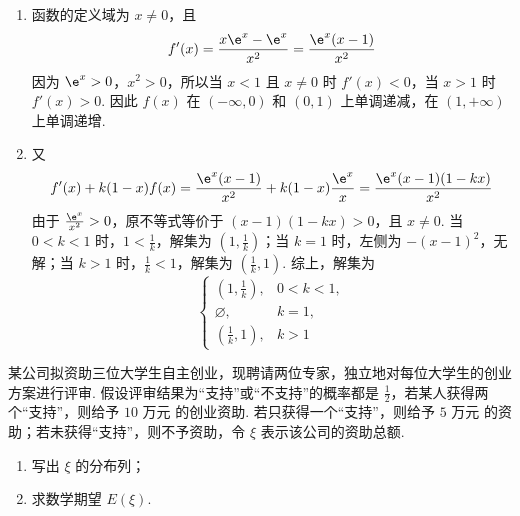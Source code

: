 \begin{solution}
\begin{enumerate}
\item
函数的定义域为 \(x\neq0\)，且
\[
f'(x)=\frac{x\e^{x}-\e^{x}}{x^{2}}=\frac{\e^{x}(x-1)}{x^{2}}
\]
因为 \(\e^{x}>0\)，\(x^{2}>0\)，所以当 \(x<1\) 且 \(x\neq0\) 时 \(f'(x)<0\)，当 \(x>1\) 时 \(f'(x)>0\). 因此 \(f(x)\) 在 \((-\infty,0)\) 和 \((0,1)\) 上单调递减，在 \((1,+\infty)\) 上单调递增.

\item
又
\[
f'(x)+k(1-x)f(x)=\frac{\e^{x}(x-1)}{x^{2}}+k(1-x)\frac{\e^{x}}{x}
=\frac{\e^{x}(x-1)(1-kx)}{x^{2}}
\]
由于 \(\frac{\e^{x}}{x^{2}}>0\)，原不等式等价于 \((x-1)(1-kx)>0\)，且 \(x\neq0\). 当 \(0<k<1\) 时，\(1<\frac1k\)，解集为 \(\left(1,\frac1k\right)\)；当 \(k=1\) 时，左侧为 \(-(x-1)^{2}\)，无解；当 \(k>1\) 时，\(\frac1k<1\)，解集为 \(\left(\frac1k,1\right)\). 综上，解集为
\[
\begin{cases}
\left(1,\frac1k\right),&0<k<1,\\
\varnothing,&k=1,\\
\left(\frac1k,1\right),&k>1
\end{cases}
\]
\end{enumerate}
\end{solution}

\begin{problem}
某公司拟资助三位大学生自主创业，现聘请两位专家，独立地对每位大学生的创业方案进行评审. 假设评审结果为“支持”或“不支持”的概率都是 \(\frac{1}{2}\)，若某人获得两个“支持”，则给予 \(10\text{ 万元}\) 的创业资助. 若只获得一个“支持”，则给予 \(5\text{ 万元}\) 的资助；若未获得“支持”，则不予资助，令 \(\xi\) 表示该公司的资助总额.

\begin{enumerate}
\item 写出 \(\xi\) 的分布列；
\item 求数学期望 \(E(\xi)\).
\end{enumerate}
\end{problem}

